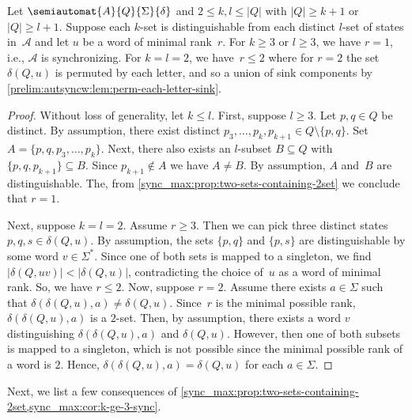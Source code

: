\begin{proposition} \label{prelim:autsyncw:prop:two-sets-min-rank} 	\label{sync_max:cor:k-ge-3-sync}
	Let $\semiautomat{A}{Q}{\Sigma}{\delta}$ and $2 \le k,l \le |Q|$ with $|Q| \ge k + 1$
	or $|Q| \ge l + 1$.
	Suppose each $k$-set is distinguishable from
	each distinct $l$-set of states in~$\mathcal A$
	and let $u$ be a word of minimal rank~$r$.
	For $k \ge 3$ or $l \ge 3$, we have $r = 1$, i.e., $\mathcal A$ is synchronizing.
	For $k = l = 2$, we have~$r \le 2$ where for $r = 2$
	the set $\delta(Q, u)$ is permuted by each letter, and so
	a union of sink components by \cref{prelim:autsyncw:lem:perm-each-letter-sink}.
\end{proposition}
\begin{proof}	
	Without loss of generality, let $k \le l$.
	First, suppose $l \ge 3$.
	Let $p,q \in Q$ be distinct.
	By assumption, there exist distinct $p_3, \ldots, p_k, p_{k+1} \in Q \setminus \{p,q\}$.
	Set $A = \{p,q,p_3, \ldots, p_k\}$.
	Next, there also exists an $l$-subset $B \subseteq Q$
	with $\{p,q,p_{k+1}\} \subseteq B$.
	Since $p_{k+1} \notin A$
	we have $A \ne B$.
	By assumption, $A$ and~$B$ are distinguishable.
	The, from \cref{sync_max:prop:two-sets-containing-2set} we conclude that $r = 1$. 
				
	Next, suppose $k = l = 2$.
	Assume $r \ge 3$. Then we can pick three distinct states $p,q,s \in \delta(Q, u)$.
	By assumption, the sets $\{p,q\}$ and $\{p,s\}$
	are distinguishable by some word $v \in \Sigma^*$.
	Since one of both sets is mapped to a singleton,
	we find $|\delta(Q, uv)| < |\delta(Q, u)|$, contradicting
	the choice of~$u$ as a word of minimal rank.
	So, we have $r \le 2$.
	Now, suppose $r = 2$.
	Assume there exists $a \in \Sigma$
	such that $\delta(\delta(Q, u), a) \ne \delta(Q, u)$.
	Since~$r$ is the minimal possible rank, $\delta(\delta(Q, u), a)$
	is a $2$-set.
	Then, by assumption, there exists a word $v$
	distinguishing $\delta(\delta(Q, u), a)$
	and $\delta(Q, u)$.
	However, then one of both subsets is mapped
	to a singleton, which is not possible
	since the minimal possible rank of a word is $2$.
	Hence, $\delta(\delta(Q, u), a) = \delta(Q, u)$
	for each $a \in \Sigma$.	
\end{proof}

Next, we list a few
consequences of \cref{sync_max:prop:two-sets-containing-2set,sync_max:cor:k-ge-3-sync}.

